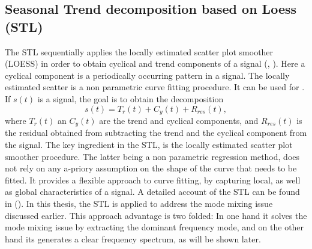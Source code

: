 \documentclass[../Main/thesis.tex]{subfiles}
\begin{document}
\justify
\subsection{Seasonal Trend decomposition based on Loess (STL)}
The STL sequentially applies the locally estimated scatter plot smoother (LOESS) in order to obtain cyclical and trend components of a signal (\cite{Cleveland-1979}, \cite{Cleveland-et-al-1988}). Here a cyclical component is a periodically occurring pattern in a signal. The  locally estimated scatter is a non parametric curve fitting procedure.  It can be used for .
If $s(t)$ is a signal, the goal is to obtain the decomposition 
\begin{equation}
s(t) = T_{r}(t) + C_{y}(t) + R_{res}(t),
\end{equation} 
where $T_{r}(t)$ an $C_{y}(t)$ are the trend and cyclical components, and $R_{res}(t)$ is the residual obtained from subtracting  the trend and the cyclical component from the signal. The key ingredient in the STL, is the locally estimated scatter plot smoother procedure. The latter being a non parametric regression method, does not rely on any a-priory assumption on the shape of the curve that needs to be fitted. It provides a flexible approach to curve fitting, by capturing local, as well as global characteristics of a signal. A detailed account of the STL can be found in  (\cite{Cleveland-et-al-1990}).
\justify
 In this thesis, the STL is applied to address the mode mixing issue discussed earlier. This approach advantage is two folded: In one hand it solves the mode mixing issue by extracting the dominant frequency mode, and on the other hand
  its generates a clear frequency spectrum, as will be shown later.
\end{document}
